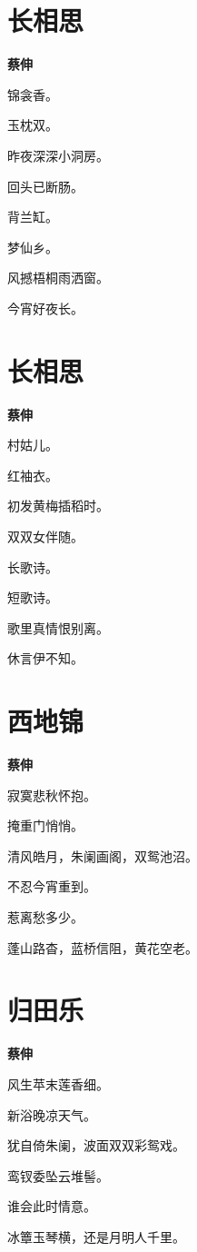 \documentclass[12pt,a4paper]{ctexbook}
\begin{document}
\section{长相思}
\textbf{蔡伸}\par\vspace{0.5em}
锦衾香。\par
玉枕双。\par
昨夜深深小洞房。\par
回头已断肠。\par
背兰缸。\par
梦仙乡。\par
风撼梧桐雨洒窗。\par
今宵好夜长。\par

\section{长相思}
\textbf{蔡伸}\par\vspace{0.5em}
村姑儿。\par
红袖衣。\par
初发黄梅插稻时。\par
双双女伴随。\par
长歌诗。\par
短歌诗。\par
歌里真情恨别离。\par
休言伊不知。\par

\section{西地锦}
\textbf{蔡伸}\par\vspace{0.5em}
寂寞悲秋怀抱。\par
掩重门悄悄。\par
清风皓月，朱阑画阁，双鸳池沼。\par
不忍今宵重到。\par
惹离愁多少。\par
蓬山路杳，蓝桥信阻，黄花空老。\par

\section{归田乐}
\textbf{蔡伸}\par\vspace{0.5em}
风生苹末莲香细。\par
新浴晚凉天气。\par
犹自倚朱阑，波面双双彩鸳戏。\par
鸾钗委坠云堆髻。\par
谁会此时情意。\par
冰簟玉琴横，还是月明人千里。\par
\end{document}
